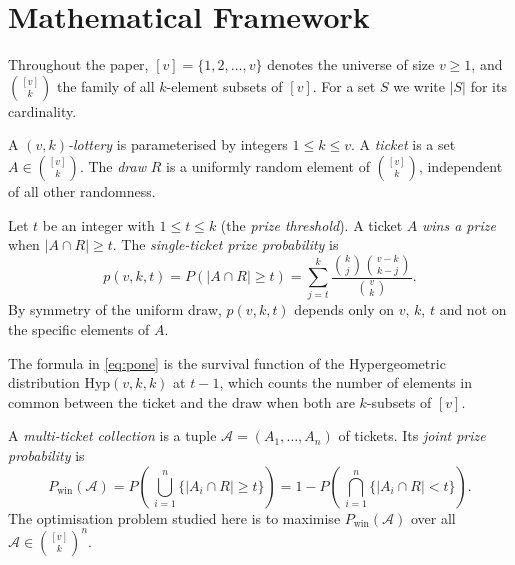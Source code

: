 
\section{Mathematical Framework}
\label{sec:framework}

Throughout the paper, $[v] = \{1,2,\ldots,v\}$ denotes the universe of size
$v \ge 1$, and $\binom{[v]}{k}$ the family of all $k$-element subsets of
$[v]$.  For a set $S$ we write $|S|$ for its cardinality.

\begin{definition}[$(v,k)$-lottery]
  A \emph{$(v,k)$-lottery} is parameterised by integers $1 \le k \le v$.
  A \emph{ticket} is a set $A \in \binom{[v]}{k}$.  The \emph{draw} $R$
  is a uniformly random element of $\binom{[v]}{k}$, independent of all
  other randomness.
\end{definition}

\begin{definition}
  \label{def:prize}
  Let $t$ be an integer with $1 \le t \le k$ (the \emph{prize threshold}).
  A ticket $A$ \emph{wins a prize} when $|A \cap R| \ge t$.  The
  \emph{single-ticket prize probability} is
  \begin{equation}
    \label{eq:pone}
    p(v,k,t)
    = P(|A \cap R| \ge t)
    = \sum_{j=t}^{k}
      \frac{\binom{k}{j}\binom{v-k}{k-j}}{\binom{v}{k}}.
  \end{equation}
  By symmetry of the uniform draw, $p(v,k,t)$ depends only on $v$, $k$, $t$
  and not on the specific elements of $A$.
\end{definition}

The formula in \eqref{eq:pone} is the survival function of the Hypergeometric
distribution $\mathrm{Hyp}(v,k,k)$ at $t-1$, which counts the number of
elements in common between the ticket and the draw when both are $k$-subsets
of $[v]$.

\begin{definition}
  A \emph{multi-ticket collection} is a tuple $\mathcal{A} = (A_1,\ldots,A_n)$
  of tickets.  Its \emph{joint prize probability} is
  \begin{equation}
    \label{eq:Pwin}
    P_{\mathrm{win}}(\mathcal{A})
    = P\!\left(\,\bigcup_{i=1}^{n} \{|A_i \cap R| \ge t\}\right)
    = 1 - P\!\left(\,\bigcap_{i=1}^{n} \{|A_i \cap R| < t\}\right).
  \end{equation}
  The optimisation problem studied here is to maximise
  $P_{\mathrm{win}}(\mathcal{A})$ over all $\mathcal{A} \in \binom{[v]}{k}^n$.
\end{definition}

